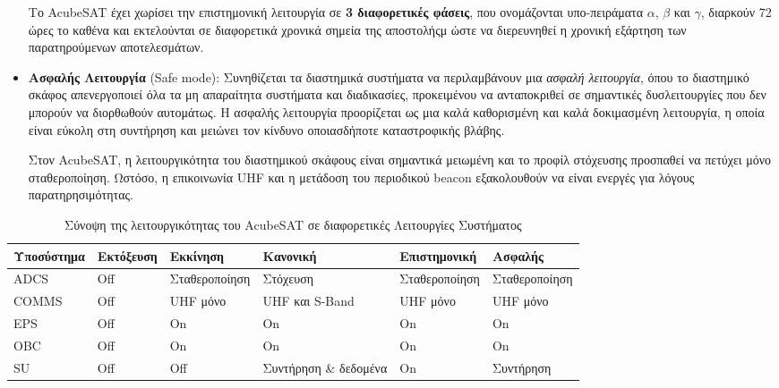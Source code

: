 \documentclass[a4paper,nobib]{tufte-book}
\begin{document}
\begin{itemize}
	Το AcubeSAT έχει χωρίσει την επιστημονική λειτουργία σε \textbf{3 διαφορετικές φάσεις}, που ονομάζονται υπο-πειράματα \(\alpha\), \(\beta\) και \(\gamma\), διαρκούν 72 ώρες το καθένα και εκτελούνται σε διαφορετικά χρονικά σημεία της αποστολήςμ ώστε να διερευνηθεί η χρονική εξάρτηση των παρατηρούμενων αποτελεσμάτων.
	
	\item \textbf{Ασφαλής Λειτουργία} (Safe mode): Συνηθίζεται τα διαστημικά συστήματα να περιλαμβάνουν μια \emph{ασφαλή λειτουργία},\autocite[385]{aguirre_introduction_space_2013} όπου το διαστημικό σκάφος απενεργοποιεί όλα τα μη απαραίτητα συστήματα και διαδικασίες, προκειμένου να ανταποκριθεί σε σημαντικές δυσλειτουργίες που δεν μπορούν να διορθωθούν αυτομάτως. Η ασφαλής λειτουργία προορίζεται ως μια καλά καθορισμένη και καλά δοκιμασμένη λειτουργία, η οποία είναι εύκολη στη συντήρηση και μειώνει τον κίνδυνο οποιασδήποτε καταστροφικής βλάβης.
	\label{itm:safe_mode}
	
	Στον AcubeSAT, η λειτουργικότητα του διαστημικού σκάφους είναι σημαντικά μειωμένη και το προφίλ στόχευσης προσπαθεί να πετύχει μόνο σταθεροποίηση. Ωστόσο, η επικοινωνία \ac{UHF} και η μετάδοση του περιοδικού beacon εξακολουθούν να είναι ενεργές για λόγους παρατηρησιμότητας.
\end{itemize}

\begin{table}[h]
	\centering
	\caption{Σύνοψη της λειτουργικότητας του AcubeSAT σε διαφορετικές Λειτουργίες Συστήματος}
	\label{tab:acubesatmodes}
	\begin{tabular}{@{}llllll@{}}
		\toprule
		Υποσύστημα    & Εκτόξευση & Εκκίνηση & Κανονική                 & Επιστημονική        & Ασφαλής             \\ \midrule
		\acs{ADCS}  & \color{off} Off    & Σταθεροποίηση     & \color{on} Στόχευση                & Σταθεροποίηση     & Σταθεροποίηση       \\
		\acs{COMMS} & \color{off} Off    & \acs{UHF} μόνο & \color{on} \acs{UHF} και S-Band    & \acs{UHF} μόνο & \acs{UHF} μόνο   \\
		\acs{EPS}   & \color{off} Off    & \color{on} On             & \color{on} On                      & \color{on} On             & \color{on} On               \\
		\acs{OBC}   & \color{off} Off    & \color{on} On             & \color{on} On                      & \color{on} On             & \color{on} On               \\
		\acs{SU}    & \color{off} Off    & \color{off} Off            & Συντήρηση \& δεδομένα & \color{on} On             & Συντήρηση \\ \bottomrule
	\end{tabular}
	\vspace{1em}
\end{table}
\end{document}
